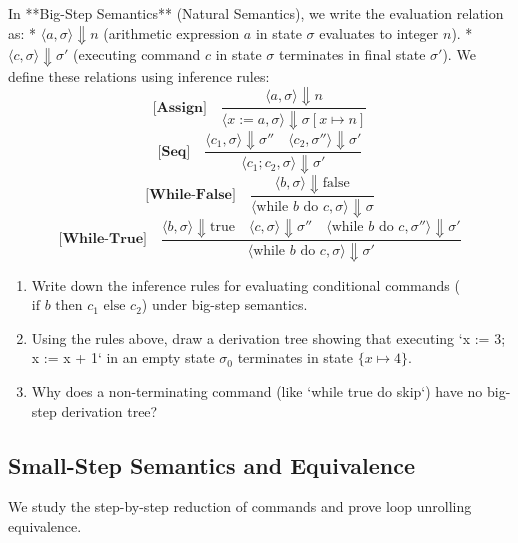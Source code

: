 \documentclass[12pt, a4paper]{book}
\begin{document}
\begin{explobox}
In **Big-Step Semantics** (Natural Semantics), we write the evaluation relation as:
* $\langle a, \sigma \rangle \Downarrow n$ (arithmetic expression $a$ in state $\sigma$ evaluates to integer $n$).
* $\langle c, \sigma \rangle \Downarrow \sigma'$ (executing command $c$ in state $\sigma$ terminates in final state $\sigma'$).
We define these relations using inference rules:
\[
  \textbf{[Assign]} \quad \frac{\langle a, \sigma \rangle \Downarrow n}{\langle x := a, \sigma \rangle \Downarrow \sigma[x \mapsto n]}
\]
\[
  \textbf{[Seq]} \quad \frac{\langle c_1, \sigma \rangle \Downarrow \sigma'' \quad \langle c_2, \sigma'' \rangle \Downarrow \sigma'}{\langle c_1 ; c_2, \sigma \rangle \Downarrow \sigma'}
\]
\[
  \textbf{[While-False]} \quad \frac{\langle b, \sigma \rangle \Downarrow \text{false}}{\langle \text{while } b \text{ do } c, \sigma \rangle \Downarrow \sigma}
\]
\[
  \textbf{[While-True]} \quad \frac{\langle b, \sigma \rangle \Downarrow \text{true} \quad \langle c, \sigma \rangle \Downarrow \sigma'' \quad \langle \text{while } b \text{ do } c, \sigma'' \rangle \Downarrow \sigma'}{\langle \text{while } b \text{ do } c, \sigma \rangle \Downarrow \sigma'}
\]
\begin{enumerate}[label=(\alph*), leftmargin=*]
  \item Write down the inference rules for evaluating conditional commands ($\text{if } b \text{ then } c_1 \text{ else } c_2$) under big-step semantics.
  \item Using the rules above, draw a derivation tree showing that executing `x := 3; x := x + 1` in an empty state $\sigma_0$ terminates in state $\{x \mapsto 4\}$.
  \item Why does a non-terminating command (like `while true do skip`) have no big-step derivation tree?
\end{enumerate}
\end{explobox}

\subsection{Small-Step Semantics and Equivalence}

We study the step-by-step reduction of commands and prove loop unrolling equivalence.
\end{document}
